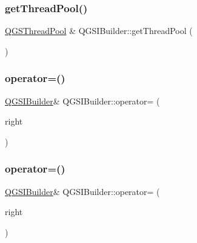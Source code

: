 \mbox{\label{class_q_g_s_i_builder_acbd6b48827bfde420151366b4e74be5c}} 
\subsubsection{\texorpdfstring{get\+Thread\+Pool()}{getThreadPool()}}
{\footnotesize\ttfamily \mbox{\hyperlink{class_q_g_s_thread_pool}{Q\+G\+S\+Thread\+Pool}} \& Q\+G\+S\+I\+Builder\+::get\+Thread\+Pool (\begin{DoxyParamCaption}{ }\end{DoxyParamCaption})\hspace{0.3cm}{\ttfamily [static]}}

\mbox{\label{class_q_g_s_i_builder_afcf032510d95419640059ca926e0fcdb}} 
\subsubsection{\texorpdfstring{operator=()}{operator=()}\hspace{0.1cm}{\footnotesize\ttfamily [1/2]}}
{\footnotesize\ttfamily \mbox{\hyperlink{class_q_g_s_i_builder}{Q\+G\+S\+I\+Builder}}\& Q\+G\+S\+I\+Builder\+::operator= (\begin{DoxyParamCaption}\item[{const \mbox{\hyperlink{class_q_g_s_i_builder}{Q\+G\+S\+I\+Builder}} \&}]{right }\end{DoxyParamCaption})\hspace{0.3cm}{\ttfamily [delete]}}

\mbox{\label{class_q_g_s_i_builder_aeda0f19abf12d6978d1f0c31f1e2d9ec}} 
\subsubsection{\texorpdfstring{operator=()}{operator=()}\hspace{0.1cm}{\footnotesize\ttfamily [2/2]}}
{\footnotesize\ttfamily \mbox{\hyperlink{class_q_g_s_i_builder}{Q\+G\+S\+I\+Builder}}\& Q\+G\+S\+I\+Builder\+::operator= (\begin{DoxyParamCaption}\item[{\mbox{\hyperlink{class_q_g_s_i_builder}{Q\+G\+S\+I\+Builder}} \&\&}]{right }\end{DoxyParamCaption})\hspace{0.3cm}{\ttfamily [delete]}}


